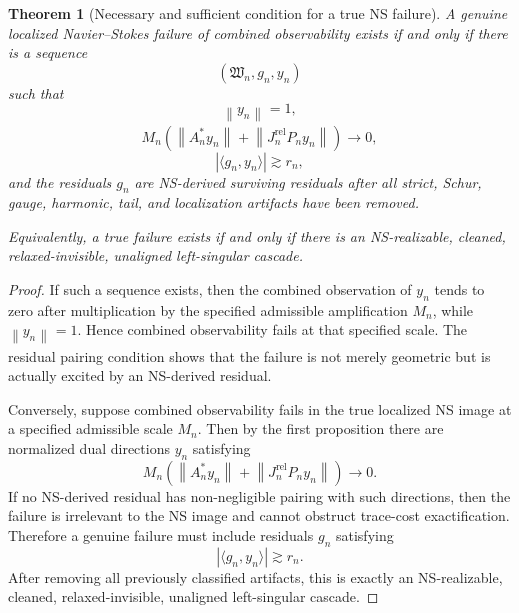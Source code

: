 \documentclass[11pt]{article}
\numberwithin{equation}{section}
\newtheorem{theorem}{Theorem}[section]
\newcommand{\norm}[2]{\left\|#1\right\|_{#2}}
\begin{document}
\begin{theorem}[Necessary and sufficient condition for a true NS failure]
A genuine localized Navier--Stokes failure of combined observability exists if and only if there is a sequence
\[
(\mathfrak W_n,g_n,y_n)
\]
such that
\[
\norm{y_n}{}=1,
\]
\[
M_n\left(
\norm{A_n^*y_n}{}
+
\norm{J_n^{\mathrm{rel}}P_ny_n}{}
\right)\to0,
\]
\[
|\langle g_n,y_n\rangle|\gtrsim r_n,
\]
and the residuals \(g_n\) are NS-derived surviving residuals after all strict, Schur, gauge, harmonic, tail, and localization artifacts have been removed.

Equivalently, a true failure exists if and only if there is an NS-realizable, cleaned, relaxed-invisible, unaligned left-singular cascade.
\end{theorem}

\begin{proof}
If such a sequence exists, then the combined observation of \(y_n\) tends to zero after multiplication by the specified admissible amplification \(M_n\), while \(\norm{y_n}{}=1\). Hence combined observability fails at that specified scale. The residual pairing condition shows that the failure is not merely geometric but is actually excited by an NS-derived residual.

Conversely, suppose combined observability fails in the true localized NS image at a specified admissible scale \(M_n\). Then by the first proposition there are normalized dual directions \(y_n\) satisfying
\[
M_n\left(
\norm{A_n^*y_n}{}
+
\norm{J_n^{\mathrm{rel}}P_ny_n}{}
\right)\to0.
\]
If no NS-derived residual has non-negligible pairing with such directions, then the failure is irrelevant to the NS image and cannot obstruct trace-cost exactification. Therefore a genuine failure must include residuals \(g_n\) satisfying
\[
|\langle g_n,y_n\rangle|\gtrsim r_n.
\]
After removing all previously classified artifacts, this is exactly an NS-realizable, cleaned, relaxed-invisible, unaligned left-singular cascade.
\end{proof}
\end{document}
